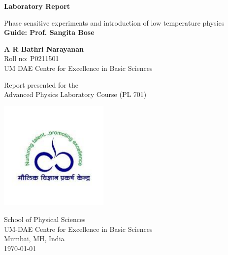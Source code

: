\begin{titlepage}
	\begin{center}
		\vspace*{1cm}
		
		\Huge
		\textbf{Laboratory Report}
		
		\vspace{0.5cm}
		\LARGE
		Phase sensitive experiments and introduction of low temperature physics\\
		\vspace{0.5cm}
		\textbf{Guide: Prof. Sangita Bose}
		
		\vspace{1.5cm}
		
		\textbf{A R Bathri Narayanan}\\
		Roll no: P0211501\\
		UM DAE Centre for Excellence in Basic Sciences
		
		\vspace{3 cm}
		
		Report presented for the\\
		Advanced Physics Laboratory Course (PL 701)
		
		\vspace{0.8cm}
		
		\includegraphics[width=0.4\textwidth]{cebs.jpg}
		
		\Large
		School of Physical Sciences\\
		UM-DAE Centre for Excellence in Basic Sciences\\
		Mumbai, MH, India\\
		\today
		
	\end{center}
\end{titlepage}